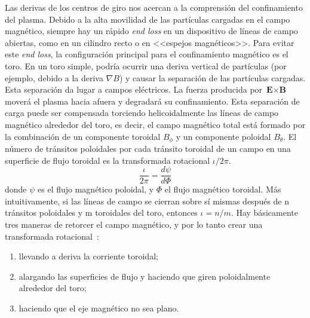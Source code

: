 \par
Las derivas de los centros de giro nos acercan a la comprensión del confinamiento del plasma. 
Debido a la alta movilidad de las partículas cargadas en el campo magnético, siempre hay un 
rápido \textit{end loss} en un dispositivo de líneas de campo abiertas, como en un cilindro recto o en 
<<espejos magnéticos>>. Para evitar este \textit{end loss}, la configuración principal para el 
confinamiento magnético es el toro. En un toro simple, podría ocurrir una deriva vertical de 
partículas (por ejemplo, debido a la deriva $\nabla B$) y causar la separación de las partículas 
cargadas. Esta separación da lugar a campos eléctricos. 
La fuerza producida por $\textbf{E}\times\textbf{B}$ moverá el plasma hacia afuera y degradará su confinamiento. 
Esta separación de carga puede ser compensada torciendo helicoidalmente las líneas 
de campo magnético alrededor del toro, es decir, el campo magnético total está formado por 
la combinación de un componente toroidal $B_\phi$ y un componente poloidal $B_\theta$. El número de 
tránsitos poloidales por cada tránsito toroidal de un campo en una superficie de flujo toroidal 
es la transformada rotacional $\iota/2\pi$.
\begin{equation}\label{eq:transrot}
    \frac{\iota}{2\pi}=\frac{d\psi}{d\Phi}
\end{equation}
donde $\psi$ es el flujo magnético poloidal, y $\Phi$ el flujo magnético toroidal. Más intuitivamente, si
las líneas de campo se cierran sobre sí mismas después de n tránsitos poloidales y m 
toroidales del toro, entonces $\iota=n/m$.\newpage
Hay básicamente tres maneras de retorcer el campo magnético, y por lo tanto crear una transformada rotacional~\cite{Helander_2012}:
\begin{enumerate}[(1)]
    \item llevando a deriva la corriente toroidal;
    \item alargando las superficies de flujo y haciendo que giren poloidalmente alrededor del toro;
    \item haciendo que el eje magnético no sea plano.
\end{enumerate}
